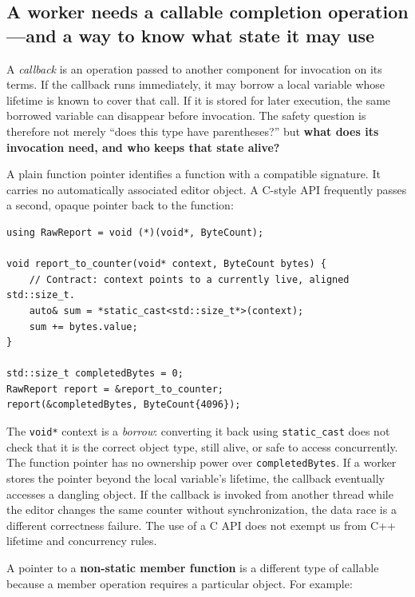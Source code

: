 \subsection{A worker needs a callable completion operation---and a way to know what state it may use}\label{05-engine-i-ch004-a-worker-needs-a-callable-completion-operationand-a-way-to-know-what-state-it-may-use}

A \emph{callback} is an operation passed to another component for invocation on its terms. If the callback runs immediately, it may borrow a local variable whose lifetime is known to cover that call. If it is stored for later execution, the same borrowed variable can disappear before invocation. The safety question is therefore not merely ``does this type have parentheses?'' but \textbf{what does its invocation need, and who keeps that state alive?}

A plain function pointer identifies a function with a compatible signature. It carries no automatically associated editor object. A C-style API frequently passes a second, opaque pointer back to the function:

\begin{verbatim}
using RawReport = void (*)(void*, ByteCount);

void report_to_counter(void* context, ByteCount bytes) {
    // Contract: context points to a currently live, aligned std::size_t.
    auto& sum = *static_cast<std::size_t*>(context);
    sum += bytes.value;
}

std::size_t completedBytes = 0;
RawReport report = &report_to_counter;
report(&completedBytes, ByteCount{4096});
\end{verbatim}

The \texttt{void*} context is a \emph{borrow}: converting it back using \texttt{static\_cast} does not check that it is the correct object type, still alive, or safe to access concurrently. The function pointer has no ownership power over \texttt{completedBytes}. If a worker stores the pointer beyond the local variable's lifetime, the callback eventually accesses a dangling object. If the callback is invoked from another thread while the editor changes the same counter without synchronization, the data race is a different correctness failure. The use of a C API does not exempt us from C++ lifetime and concurrency rules.

A pointer to a \textbf{non-static member function} is a different type of callable because a member operation requires a particular object. For example:

